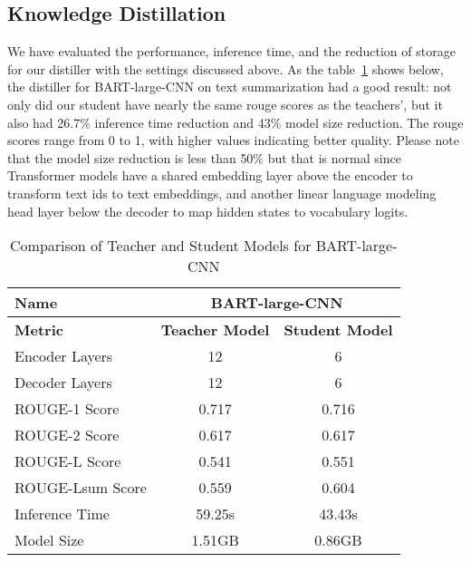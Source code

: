 \subsection{Knowledge Distillation}
We have evaluated the performance, inference time, and the reduction of storage for our distiller with the settings discussed above. As the table~\ref{tab:BART_comparison} shows below, the distiller for BART-large-CNN on text summarization had a good result: not only did our student have nearly the same rouge scores as the teachers', but it also had 26.7\% inference time reduction and 43\% model size reduction. The rouge scores range from 0 to 1, with higher values indicating better quality. Please note that the model size reduction is less than 50\% but that is normal since Transformer models have a shared embedding layer above the encoder to transform text ids to text embeddings,  %
and another linear language modeling head layer below the decoder to map hidden states to vocabulary logits. %

\begin{table}[h!]
    \centering
    \begin{tabular}{lcc}
        \toprule
        \textbf{Name}         & \multicolumn{2}{c}{\textbf{BART-large-CNN}} \\ \midrule
        \textbf{Metric}       & \textbf{Teacher Model} & \textbf{Student Model} \\ \midrule
        Encoder Layers        & 12                     & 6                     \\
        Decoder Layers        & 12                     & 6                     \\
        ROUGE-1 Score         & 0.717                  & 0.716                  \\
        ROUGE-2 Score         & 0.617                  & 0.617                  \\
        ROUGE-L Score         & 0.541                  & 0.551                  \\
        ROUGE-Lsum Score      & 0.559                  & 0.604                  \\
        Inference Time        & 59.25s                 & 43.43s                 \\
        Model Size            & 1.51GB                 & 0.86GB                 \\ \bottomrule
    \end{tabular}
    \caption{Comparison of Teacher and Student Models for BART-large-CNN}
    \label{tab:BART_comparison}
\end{table}

